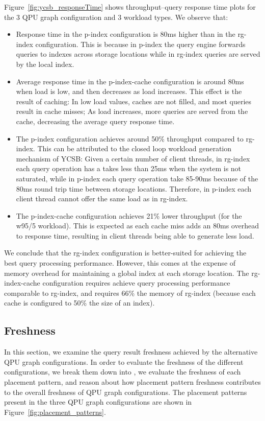Figure~\ref{fig:ycsb_responseTime} shows throughput--query response time plots for the 3 QPU graph configuration and 3 workload
types.
We observe that:
\begin{itemize}
  \item Response time in the p-index configuration is 80ms higher than in the rg-index configuration.
  This is because in p-index the query engine forwards queries to indexes across storage locations while
  in rg-index queries are served by the local index.
  \item Average response time in the p-index-cache configuration is around 80ms when load is low,
  and then decreases as load increases.
  This effect is the result of caching:
  In low load values, caches are not filled, and most queries result in cache misses;
  As load increases, more queries are served from the cache, decreasing the average query response time.
  \item The p-index configuration achieves around 50\% throughput compared to rg-index.
  This can be attributed to the closed loop workload generation mechanism of YCSB:
  Given a certain number of client threads, in rg-index each query operation has a takes less than 25ms
  when the system is not saturated, while in p-index each query operation take 85-90ms because of the 80ms
  round trip time between storage locations.
  Therefore, in p-index each client thread cannot offer the same load as in rg-index.
  \item The p-index-cache configuration achieves 21\% lower throughput (for the w95/5 workload).
  This is expected as each cache miss adds an 80ms overhead to response time,
  resulting in client threads being able to generate less load.
\end{itemize}

We conclude that the rg-index configuration is better-suited for achieving the best query processing performance.
However, this comes at the expense of memory overhead for maintaining a global index at each storage location.
The rg-index-cache configuration requires achieve query processing performance comparable to rg-index,
and requires 66\% the memory of rg-index (because each cache is configured to 50\% the size of an index).

\subsection{Freshness}

In this section, we examine the query result freshness achieved by the alternative QPU graph configurations.
In order to evaluate the freshness of the different configurations,
we break them down into , we evaluate the freshness of each placement pattern,
and reason about how placement pattern freshness contributes to the overall freshness of QPU graph configurations.
The placement patterns present in the three QPU graph configurations are shown in Figure~\ref{fig:placement_patterns}.

